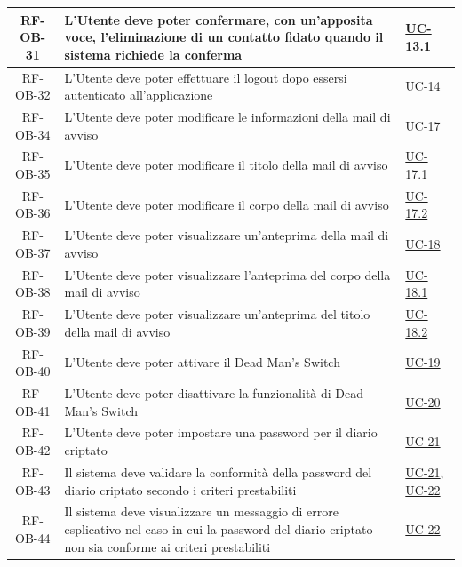 \documentclass[a4paper,12pt]{article}
\begin{document}
\begin{center}
\begin{longtable}{|c|p{8.5cm}|>{\centering\arraybackslash}p{4cm}|}
RF-OB-31 & L'Utente deve poter confermare, con un'apposita voce, l'eliminazione di un contatto fidato quando il sistema richiede la conferma & \hyperref[subsec:UC-13.1]{UC-13.1} \\
\hline

RF-OB-32 & L'Utente deve poter effettuare il logout dopo essersi autenticato all'applicazione & \hyperref[subsec:UC-14]{UC-14} \\
\hline

RF-OB-34 & L'Utente deve poter modificare le informazioni della mail di avviso & \hyperref[sec:UC-17]{UC-17} \\
\hline

RF-OB-35 & L'Utente deve poter modificare il titolo della mail di avviso & \hyperref[sec:UC-17.1]{UC-17.1} \\
\hline

RF-OB-36 & L'Utente deve poter modificare il corpo della mail di avviso & \hyperref[sec:UC-17.2]{UC-17.2} \\
\hline

RF-OB-37 & L'Utente deve poter visualizzare un'anteprima della mail di avviso & \hyperref[sec:UC-18]{UC-18} \\
\hline

RF-OB-38 & L'Utente deve poter visualizzare l'anteprima del corpo della mail di avviso & \hyperref[subsec:UC-18.1]{UC-18.1} \\
\hline

RF-OB-39 & L'Utente deve poter visualizzare un'anteprima del titolo della mail di avviso & \hyperref[subsec:UC-18.2]{UC-18.2} \\
\hline

RF-OB-40 & L'Utente deve poter attivare il Dead Man's Switch & \hyperref[sec:UC-19]{UC-19} \\
\hline

RF-OB-41 & L'Utente deve poter disattivare la funzionalità di Dead Man's Switch & \hyperref[sec:UC-20]{UC-20} \\
\hline

RF-OB-42 & L'Utente deve poter impostare una password per il diario criptato & \hyperref[subsec:UC-21]{UC-21} \\
\hline

RF-OB-43 & Il sistema deve validare la conformità della password del diario criptato secondo i criteri prestabiliti & \hyperref[subsec:UC-21]{UC-21}, \hyperref[subsec:UC-22]{UC-22} \\
\hline

RF-OB-44 & Il sistema deve visualizzare un messaggio di errore esplicativo nel caso in cui la password del diario criptato non sia conforme ai criteri prestabiliti & \hyperref[subsec:UC-22]{UC-22} \\
\hline


\end{longtable}
\end{center}
\end{document}
